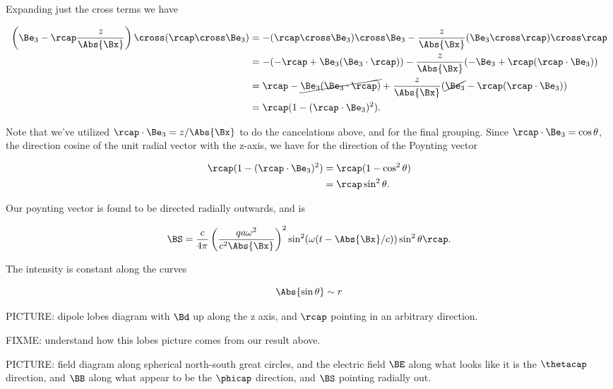Expanding just the cross terms we have

\begin{align*}
\left( \Be_3 - \rcap \frac{z}{\Abs{\Bx}} \right) \cross (\rcap \cross \Be_3)
&=
-(\rcap \cross \Be_3) \cross \Be_3 - \frac{z}{\Abs{\Bx}} (\Be_3 \cross \rcap) \cross \rcap \\
&=
-(-\rcap + \Be_3(\Be_3 \cdot \rcap) ) - \frac{z}{\Abs{\Bx}} (-\Be_3 + \rcap (\rcap \cdot \Be_3)) \\
&=
\rcap - \cancel{\Be_3(\Be_3 \cdot \rcap)} + \frac{z}{\Abs{\Bx}} (\cancel{\Be_3} - \rcap (\rcap \cdot \Be_3)) \\
&=
\rcap( 1 - (\rcap \cdot \Be_3)^2 ).
\end{align*}

Note that we've utilized $\rcap \cdot \Be_3 = z/\Abs{\Bx}$ to do the cancelations above, and for the final grouping.  Since $\rcap \cdot \Be_3 = \cos\theta$, the direction cosine of the unit radial vector with the z-axis, we have for the direction of the Poynting vector

\begin{align*}
\rcap( 1 - (\rcap \cdot \Be_3)^2 )
&= \rcap (1 - \cos^2\theta) \\
&= \rcap \sin^2\theta.
\end{align*}

Our poynting vector is found to be directed radially outwards, and is

\begin{equation}\label{eqn:relativisticElectrodynamicsL21:180}
\BS =
\frac{c}{4 \pi}
\left( \frac{q a \omega^2}{c^2 \Abs{\Bx} } \right)^2
\sin^2(\omega (t - \Abs{\Bx}/c)) \sin^2\theta \rcap.
\end{equation}

The intensity is constant along the curves

\begin{equation}\label{eqn:relativisticElectrodynamicsL21:200}
\Abs{\sin\theta} \sim r
\end{equation}

PICTURE: dipole lobes diagram with $\Bd$ up along the z axis, and $\rcap$ pointing in an arbitrary direction.

FIXME: understand how this lobes picture comes from our result above.

PICTURE: field diagram along spherical north-south great circles, and the electric field $\BE$ along what looks like it is the $\thetacap$ direction, and $\BB$ along what appear to be the $\phicap$ direction, and $\BS$ pointing radially out.


